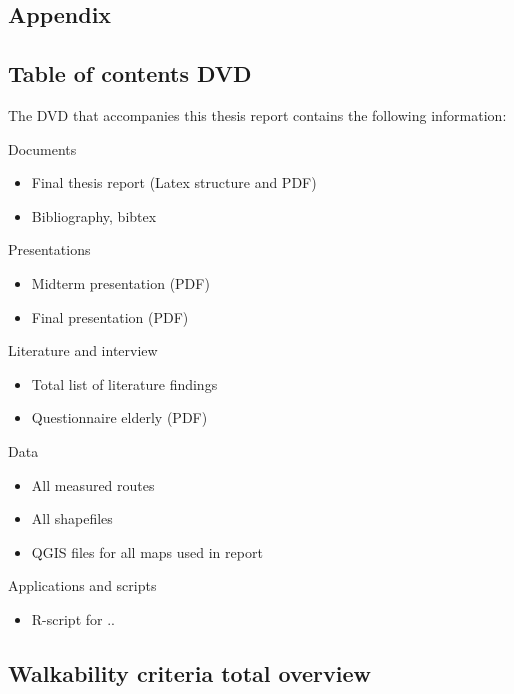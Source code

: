 
\begin{appendix}
\chapter{Appendix}

\section{Table of contents DVD}

The DVD that accompanies this thesis report contains the following information:

Documents
\begin{itemize}
	\item Final thesis report (Latex structure and PDF)
	\item Bibliography, bibtex
\end{itemize}

Presentations
\begin{itemize}
	\item Midterm presentation (PDF)
	\item Final presentation (PDF)
\end{itemize}

Literature and interview
\begin{itemize}
	\item Total list of literature findings 
	\item Questionnaire elderly (PDF)
\end{itemize}

Data
\begin{itemize}
 	\item All measured routes
 	\item All shapefiles 
 	\item QGIS files for all maps used in report
\end{itemize}

Applications and scripts
\begin{itemize}
	\item R-script for  ..
\end{itemize}	



\section{Walkability criteria total overview}\label{Acriteria}







\end{appendix}
